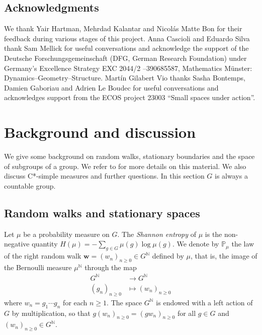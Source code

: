\documentclass[reqno,a4paper,11pt]{amsart}
\numberwithin{equation}{section}
\newcommand{\1}{\mathbf{1}}
\def\N{{\mathbb N}}
\def\P{{\mathbb P}}
\theoremstyle{definition}
\begin{document}
\subsection*{Acknowledgments}
We thank Yair Hartman, Mehrdad Kalantar and Nicolás Matte Bon for their feedback during various stages of this project. Anna Cascioli and Eduardo Silva thank Sam Mellick for useful conversations and acknowledge the support of the Deutsche Forschungsgemeinschaft (DFG, German Research Foundation) under Germany's Excellence Strategy EXC 2044/2 –390685587, Mathematics Münster: Dynamics–Geometry–Structure. Martín Gilabert Vio thanks Sasha Bontemps, Damien Gaboriau and Adrien Le Boudec for useful conversations and acknowledges support from the ECOS project 23003 “Small spaces under action”.

	
\section{Background and discussion}\label{section: preliminariesBoundaries}

We give some background on random walks, stationary boundaries and the space of subgroups of a group. We refer to \cite{Furman2002, LeBoudecMatteBon2018} for more details on this material. We also discuss C*-simple measures and further questions. In this section $G$ is always a countable group.

\subsection*{Random walks and stationary spaces}
Let $\mu$ be a probability measure on $G$. The \emph{Shannon entropy} of $\mu$ is the non-negative quantity $H(\mu) = -\sum_{g \in G} \mu(g) \log \mu(g)$. We denote by $\P_\mu$ the law of the right random walk $\mathbf{w} = (w_n)_{n \geq 0} \in G^\N$ defined by $\mu$, that is, the image of the Bernoulli measure $\mu^\N$ through the map
\begin{align*}
	G^\N & \to G^\N \\
	(g_n)_{n \geq 0}&\mapsto (w_n)_{n \geq 0}
\end{align*}
where $w_n = g_1\cdots g_n$ for each $n\ge 1$. The space $G^\N$ is endowed with a left action of $G$ by multiplication, so that $g(w_n)_{n \geq 0} = (gw_n)_{n \geq 0}$ for all $g \in G$ and $(w_n)_{n \geq 0} \in G^\N$.
\end{document}
